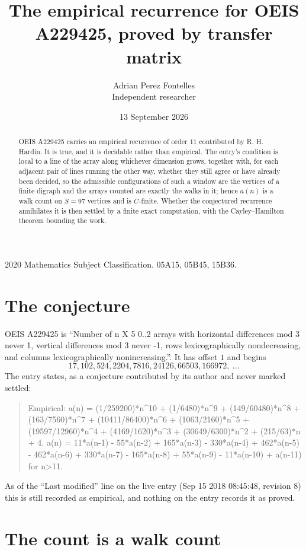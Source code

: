 \documentclass[11pt,a4paper]{article}
\title{The empirical recurrence for OEIS A229425, proved by transfer matrix}
\author{Adrian Perez Fontelles\\ \small Independent researcher}
\date{13 September 2026}
\theoremstyle{plain}
\theoremstyle{definition}
\begin{document}
\maketitle

\begin{abstract}
OEIS A229425 carries an empirical recurrence of order $11$ contributed by R. H. Hardin. It is
true, and it is decidable rather than empirical. The entry's condition is local to a line of the array along whichever dimension grows, together with, for each adjacent pair of lines running the other way, whether they still agree or have already been decided, so
the admissible configurations of such a window are the vertices of a finite digraph and the
arrays counted are exactly the walks in it; hence $a(n)$ is a walk count on $S=97$ vertices
and is $C$-finite. Whether the conjectured recurrence annihilates it is then settled by a
finite exact computation, with the Cayley--Hamilton theorem bounding the work.
\end{abstract}

\noindent\small 2020 Mathematics Subject Classification. 05A15, 05B45, 15B36.\normalsize

\section{The conjecture}

OEIS A229425 is ``Number of n X 5 0..2 arrays with horizontal differences mod 3 never 1, vertical differences mod 3 never -1, rows lexicographically nondecreasing, and columns lexicographically nonincreasing.''. It has offset $1$ and begins
\[
17, 102, 524, 2204, 7816, 24126, 66503, 166972,\ \dots
\]
The entry states, as a conjecture contributed by its author and never marked settled:
\begin{quote}
Empirical: a(n) = (1/259200)*n\^{}10 + (1/6480)*n\^{}9 + (149/60480)*n\^{}8 + (163/7560)*n\^{}7 + (10411/86400)*n\^{}6 + (1063/2160)*n\^{}5 + (19597/12960)*n\^{}4 + (4169/1620)*n\^{}3 + (30649/6300)*n\^{}2 + (215/63)*n + 4. a(n) = 11*a(n-1) - 55*a(n-2) + 165*a(n-3) - 330*a(n-4) + 462*a(n-5) - 462*a(n-6) + 330*a(n-7) - 165*a(n-8) + 55*a(n-9) - 11*a(n-10) + a(n-11) for n>11.
\end{quote}
As of the ``Last modified'' line on the live entry (Sep 15 2018 08:45:48, revision 8) this is still
recorded as empirical, and nothing on the entry records it as proved.

\section{The count is a walk count}
\end{document}
